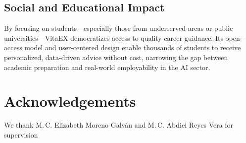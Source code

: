 \documentclass[runningheads]{llncs}
\begin{document}
\subsection*{Social and Educational Impact}

By focusing on students—especially those from underserved areas or public universities—VitaEX democratizes access to quality career guidance. Its open-access model and user-centered design enable thousands of students to receive personalized, data-driven advice without cost, narrowing the gap between academic preparation and real-world employability in the AI sector.

	
	\section*{Acknowledgements}
	We thank M.\,C. Elizabeth Moreno Galván and M.\,C. Abdiel Reyes Vera for supervision
	
\makeatletter
\renewcommand{\@biblabel}[1]{#1.} 
\makeatother



\end{document}
